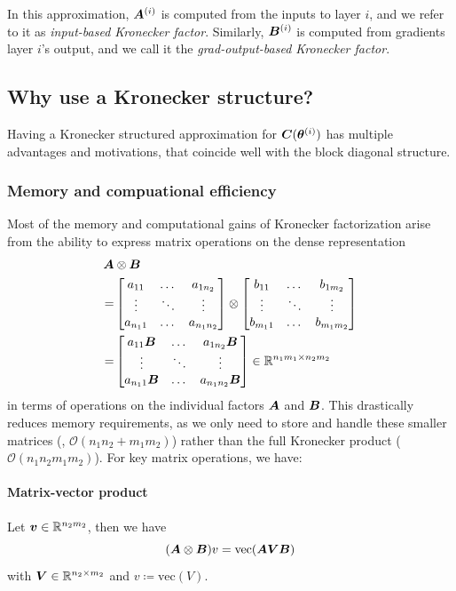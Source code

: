 In this approximation, ${\bm{A}}^{(i)}$ is computed from the inputs to layer $i$, and we refer to it as \emph{input-based Kronecker factor}.
Similarly, ${\bm{B}}^{(i)}$ is computed from gradients \wrt layer $i$'s output, and we call it the \emph{grad-output-based Kronecker factor}.

\subsection{Why use a Kronecker structure?}
Having a Kronecker structured approximation for ${\bm{C}}({\bm{\theta}}^{(i)})$ has multiple advantages and motivations, that coincide well with the block diagonal structure.

\subsubsection{Memory and compuational efficiency}
\label{sec:mem_comp_eff_kron}
Most of the memory and computational gains of Kronecker factorization arise from the ability to express matrix operations on the dense representation
\begin{align*} {\bm{A}} &\otimes {\bm{B}} \\
=&\begin{bmatrix}
  a_{11} & \dots & a_{1n_2} \\
  \vdots & \ddots & \vdots \\
  a_{n_11} & \dots & a_{n_1n_2}
\end{bmatrix}
\otimes
\begin{bmatrix}
  b_{11} & \dots & b_{1m_2} \\
  \vdots & \ddots & \vdots \\
  b_{m_11} &  \dots & b_{m_1m_2}
\end{bmatrix} \\
=&\begin{bmatrix}
  a_{11} {\bm{B}} & \dots & a_{1n_2} {\bm{B}} \\
  \vdots & \ddots & \vdots \\
  a_{n_11} {\bm{B}} & \dots & a_{n_1n_2} {\bm{B}}
\end{bmatrix} \in \mathbb{R}^{n_1m_1 \times n_2m_2}
\end{align*}
in terms of operations on the individual factors ${\bm{A}}$ and ${\bm{B}}$.
This drastically reduces memory requirements, as we only need to store and handle these smaller matrices (\ie, $\mathcal{O}(n_1n_2 + m_1m_2)$) rather than the full Kronecker product (\ie $\mathcal{O}(n_1n_2m_1m_2)$). For key matrix operations, we have:

\paragraph{Matrix-vector product}
Let ${\bm{v}} \in \mathbb{R}^{n_2m_2}$, then we have
$$ ({\bm{A}} \otimes {\bm{B}}) v = \text{vec}({\bm{A}} {\bm{V}} {\bm{B}}) $$
with ${\bm{V}} \in \mathbb{R}^{n_2\times m_2}$ and $v \coloneqq \text{vec}(V)$.

